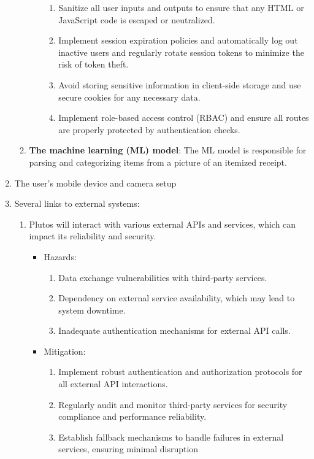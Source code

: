 \documentclass{article}
\begin{document}
\begin{enumerate}
\begin{enumerate}
\begin{itemize}
\begin{enumerate}
					\item Sanitize all user inputs and outputs to ensure that any HTML or JavaScript code is escaped or neutralized.
					\item Implement session expiration policies and automatically log out inactive users and regularly rotate session tokens to minimize the risk of token theft.
					\item Avoid storing sensitive information in client-side storage and use secure cookies for any necessary data.
					\item Implement role-based access control (RBAC) and ensure all routes are properly protected by authentication checks.
				\end{enumerate}
		\end{itemize}
        \item \textbf{The machine learning (ML) model}: The ML model is
        responsible for parsing and categorizing items from a picture of an
        itemized receipt.
    \end{enumerate}
    \item The user’s mobile device and camera setup
    \item Several links to external systems:
    \begin{enumerate}
        \item Plutos will interact with various external APIs and services, which can 
        impact its reliability and security. 
		\begin{itemize}
			\item Hazards:
				\begin{enumerate}
					\item Data exchange vulnerabilities with third-party services.
                    \item Dependency on external service availability, which may lead to system downtime.
                    \item Inadequate authentication mechanisms for external API calls.
				\end{enumerate}
			\item Mitigation:
				\begin{enumerate}
					\item Implement robust authentication and authorization protocols for all external API interactions.
                    \item Regularly audit and monitor third-party services for security compliance and performance reliability.
                    \item Establish fallback mechanisms to handle failures in external services, ensuring minimal disruption 

\end{enumerate}
\end{itemize}
\end{enumerate}
\end{enumerate}
\end{document}

